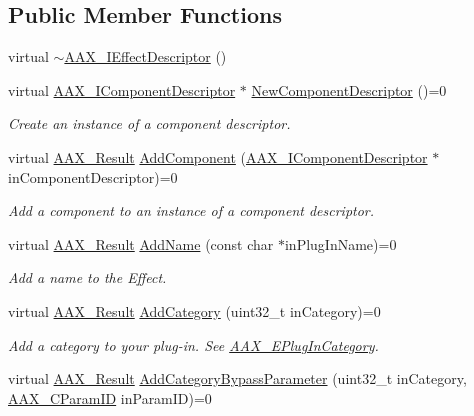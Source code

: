 \subsection*{Public Member Functions}
\begin{DoxyCompactItemize}
\item 
virtual \hyperlink{a00096_a873d7fe13518d28081478912cfc1e311}{$\sim$\+A\+A\+X\+\_\+\+I\+Effect\+Descriptor} ()
\item 
virtual \hyperlink{a00088}{A\+A\+X\+\_\+\+I\+Component\+Descriptor} $\ast$ \hyperlink{a00096_a2102ea4391f5b60e4d5e860a997383e4}{New\+Component\+Descriptor} ()=0
\begin{DoxyCompactList}\small\item\em Create an instance of a component descriptor. \end{DoxyCompactList}\item 
virtual \hyperlink{a00149_a4d8f69a697df7f70c3a8e9b8ee130d2f}{A\+A\+X\+\_\+\+Result} \hyperlink{a00096_aec33938f50461dd5e7c1dcc25faf6917}{Add\+Component} (\hyperlink{a00088}{A\+A\+X\+\_\+\+I\+Component\+Descriptor} $\ast$in\+Component\+Descriptor)=0
\begin{DoxyCompactList}\small\item\em Add a component to an instance of a component descriptor. \end{DoxyCompactList}\item 
virtual \hyperlink{a00149_a4d8f69a697df7f70c3a8e9b8ee130d2f}{A\+A\+X\+\_\+\+Result} \hyperlink{a00096_a0d3a0e258050524ba6fbc354f16df207}{Add\+Name} (const char $\ast$in\+Plug\+In\+Name)=0
\begin{DoxyCompactList}\small\item\em Add a name to the Effect. \end{DoxyCompactList}\item 
virtual \hyperlink{a00149_a4d8f69a697df7f70c3a8e9b8ee130d2f}{A\+A\+X\+\_\+\+Result} \hyperlink{a00096_aeb6683e6758f7eb00f87c153e4809641}{Add\+Category} (uint32\+\_\+t in\+Category)=0
\begin{DoxyCompactList}\small\item\em Add a category to your plug-\/in. See \hyperlink{a00206_aef9637518fb1ac0e2f403444c73aba4a}{A\+A\+X\+\_\+\+E\+Plug\+In\+Category}. \end{DoxyCompactList}\item 
virtual \hyperlink{a00149_a4d8f69a697df7f70c3a8e9b8ee130d2f}{A\+A\+X\+\_\+\+Result} \hyperlink{a00096_a8da96a465f2bd367194067a51a12816d}{Add\+Category\+Bypass\+Parameter} (uint32\+\_\+t in\+Category, \hyperlink{a00149_a1440c756fe5cb158b78193b2fc1780d1}{A\+A\+X\+\_\+\+C\+Param\+I\+D} in\+Param\+I\+D)=0

\end{DoxyCompactItemize}
